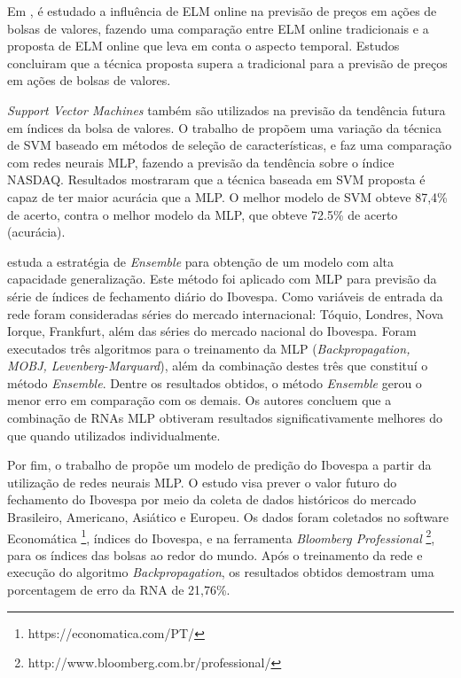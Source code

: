 \documentclass[12pt,a4paper,utf8]{ppgsi}
\begin{document}
Em \cite{Zhao201279}, é estudado a influência de ELM online na previsão de preços em ações de bolsas de valores, fazendo uma comparação entre ELM online tradicionais e a proposta de ELM online que leva em conta o aspecto temporal. Estudos concluiram que a técnica proposta supera a tradicional para a previsão de preços em ações de bolsas de valores.

\textit{Support Vector Machines} também são utilizados na previsão da tendência futura em índices da bolsa de valores. O trabalho de \cite{Lee200910896} propõem uma variação da técnica de SVM baseado em métodos de seleção de características, e faz uma comparação com redes neurais MLP, fazendo a previsão da tendência sobre o índice NASDAQ. Resultados mostraram que a técnica baseada em SVM proposta é capaz de ter maior acurácia que a MLP. O melhor modelo de SVM obteve 87,4\% de acerto, contra o melhor modelo da MLP, que obteve 72.5\% de acerto (acurácia).

\citep{Castro2005} estuda a estratégia de \textit{Ensemble} para obtenção de um modelo com alta capacidade generalização. Este método foi aplicado com MLP para previsão da série de índices de fechamento diário do Ibovespa. Como variáveis de entrada da rede foram consideradas séries do mercado internacional: Tóquio, Londres, Nova Iorque, Frankfurt, além das séries do mercado nacional do Ibovespa. Foram executados três algoritmos para o treinamento da MLP (\textit{Backpropagation, MOBJ, Levenberg-Marquard}), além da combinação destes três que constituí o método \textit{Ensemble}. Dentre os resultados obtidos, o método \textit{Ensemble} gerou o menor erro em comparação com os demais. Os autores concluem que a combinação de RNAs MLP obtiveram resultados significativamente melhores do que quando utilizados individualmente.

Por fim, o trabalho de \citep{Santos2010} propõe um modelo de predição do Ibovespa a partir da utilização de redes neurais MLP. O estudo visa prever o valor futuro do fechamento do Ibovespa por meio da coleta de dados históricos do mercado Brasileiro, Americano, Asiático e Europeu. Os dados foram coletados no software Economática \footnote{https://economatica.com/PT/}, índices do Ibovespa, e na ferramenta \textit{Bloomberg Professional} \footnote{http://www.bloomberg.com.br/professional/}, para os índices das bolsas ao redor do mundo. Após o treinamento da rede e execução do algoritmo \textit{Backpropagation}, os resultados obtidos demostram uma porcentagem de erro da RNA de 21,76\%. 
\end{document}
